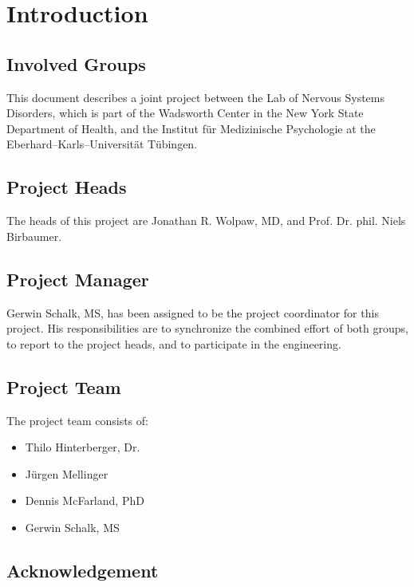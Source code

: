 \documentclass[letterpaper,oneside,12pt]{book}
\begin{document}
\frontmatter


\tableofcontents

\mainmatter

\chapter{Introduction}

\section{Involved Groups}

This document describes a joint project between the Lab of Nervous Systems 
Disorders, which is part of the Wadsworth Center in the New York State 
Department of Health, and the Institut f\"ur Medizinische Psychologie at the 
Eberhard--Karls--Universit\"at T\"ubingen.

\section{Project Heads}

The heads of this project are Jonathan R. Wolpaw, MD, and Prof. Dr. phil. Niels 
Birbaumer.

\section{Project Manager}

Gerwin Schalk, MS, has been assigned to be the project coordinator for this 
project. His responsibilities are to synchronize the combined effort of both 
groups, to report to the project heads, and to participate in the engineering.

\section{Project Team}

The project team consists of:
\begin{itemize}
 \item{Thilo Hinterberger, Dr.}
 \item{J\"urgen Mellinger}
 \item{Dennis McFarland, PhD}
 \item{Gerwin Schalk, MS}
\end{itemize}


\section{Acknowledgement}
\end{document}
